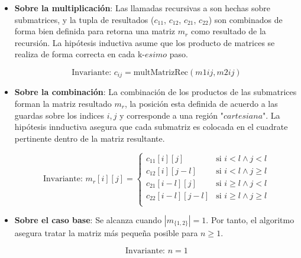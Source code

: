 \documentclass[12pt, a4paper]{article}
\begin{document}
\begin{itemize}
\begin{itemize}
        \item \textbf{Sobre la multiplicación}: Las llamadas recursivas a  son hechas sobre submatrices, y la tupla de resultados ($c_{11}$, $c_{12}$, $c_{21}$, $c_{22}$) son combinados de forma bien definida para retorna una matriz $m_r$ como resultado de la recursión. 
        La hipótesis inductiva asume que los producto de matrices se realiza de forma correcta en cada k-$esimo$ paso.
        
        \[
        \text{{Invariante: }} c_{ij} = \text{{multMatrizRec}}(m{{1{ij}}}, m{{2{ij}}})
        \]
        \item \textbf{Sobre la combinación}: La combinación de los productos de las submatrices forman la matriz resultado $m_r$, la posición esta definida de acuerdo a las guardas sobre los indices $i,j$ y corresponde a una región "$cartesiana$".
        La hipótesis innductiva asegura que cada submatriz es colocada en el cuadrate pertinente dentro de la matriz resultante.
        
        \[
        \text{{Invariante: }} m_r[i][j] = \begin{cases}
        c_{11}[i][j] & \text{{si }} i < l \land j < l \\
        c_{12}[i][j-l] & \text{{si }} i < l \land j \geq l \\
        c_{21}[i-l][j] & \text{{si }} i \geq l \land j < l \\
        c_{22}[i-l][j-l] & \text{{si }} i \geq l \land j \geq l \\
        \end{cases}
        \]

        \item \textbf{Sobre el caso base}: Se alcanza cuando $|m_{\{1,2\}}| = 1$. Por tanto, el algoritmo asegura tratar la matriz más pequeña posible
        para $n\geq 1$.
        
        \[
        \text{{Invariante: }} n = 1
        \]
    \end{itemize}
\end{itemize}
\end{document}
